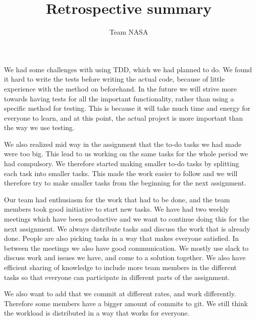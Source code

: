 \documentclass{article}
\title{Retrospective summary}
\author{Team NASA}
\date{}
\begin{document}
\maketitle

\section*{}
We had some challenges with using TDD, which we had planned to do. We found it hard to write the tests before writing the actual code, because of little experience with the method on beforehand. In the future we will strive more towards having tests for all the important functionality, rather than using a specific method for testing. This is because it will take much time and energy for everyone to learn, and at this point, the actual project is more important than the way we use testing. 

We also realized mid way in the assignment that the to-do tasks we had made were too big. This lead to us working on the same tasks for the whole period we had compulsory. We therefore started making smaller to-do tasks by splitting each task into smaller tasks. This made the work easier to follow and we will therefore try to make smaller tasks from the beginning for the next assignment.

Our team had enthusiasm for the work that had to be done, and the team members took good initiative to start new tasks. We have had two weekly meetings which have been productive and we want to continue doing this for the next assignment. We always distribute tasks and discuss the work that is already done. People are also picking tasks in a way that makes everyone satisfied. In between the meetings we also have good communication. We mostly use slack to discuss work and issues we have, and come to a solution together. We also have efficient sharing of knowledge to include more team members in the different tasks so that everyone can participate in different parts of the assignment.

We also want to add that we commit at different rates, and work differently. Therefore some members have a bigger amount of commits to git. We still think the workload is distributed in a way that works for everyone.
\end{document}
